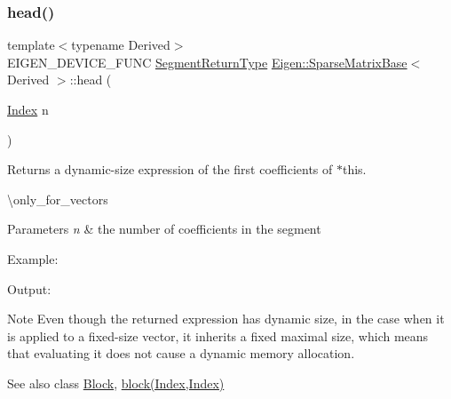 \subsubsection{\texorpdfstring{head()}{head()}\hspace{0.1cm}{\footnotesize\ttfamily [1/2]}}
{\footnotesize\ttfamily template$<$typename Derived$>$ \\
E\+I\+G\+E\+N\+\_\+\+D\+E\+V\+I\+C\+E\+\_\+\+F\+U\+NC \mbox{\hyperlink{class_eigen_1_1_vector_block}{Segment\+Return\+Type}} \mbox{\hyperlink{class_eigen_1_1_sparse_matrix_base}{Eigen\+::\+Sparse\+Matrix\+Base}}$<$ Derived $>$\+::head (\begin{DoxyParamCaption}\item[{\mbox{\hyperlink{struct_eigen_1_1_eigen_base_a554f30542cc2316add4b1ea0a492ff02}{Index}}}]{n }\end{DoxyParamCaption})\hspace{0.3cm}{\ttfamily [inline]}}

\begin{DoxyReturn}{Returns}
a dynamic-\/size expression of the first coefficients of $\ast$this.
\end{DoxyReturn}
\textbackslash{}only\+\_\+for\+\_\+vectors


\begin{DoxyParams}{Parameters}
{\em n} & the number of coefficients in the segment\\
\hline
\end{DoxyParams}
Example\+: 
\begin{DoxyCodeInclude}{0}
\end{DoxyCodeInclude}
 Output\+: 
\begin{DoxyVerbInclude}
\end{DoxyVerbInclude}


\begin{DoxyNote}{Note}
Even though the returned expression has dynamic size, in the case when it is applied to a fixed-\/size vector, it inherits a fixed maximal size, which means that evaluating it does not cause a dynamic memory allocation.
\end{DoxyNote}
\begin{DoxySeeAlso}{See also}
class \mbox{\hyperlink{class_eigen_1_1_block}{Block}}, \mbox{\hyperlink{class_eigen_1_1_sparse_matrix_base_ad7a342adc59c2866c323ace6d2f65378}{block(\+Index,\+Index)}} 
\end{DoxySeeAlso}
\mbox{\label{class_eigen_1_1_sparse_matrix_base_a29ab4aa54c376d9166252d545f98d3cd}} 
